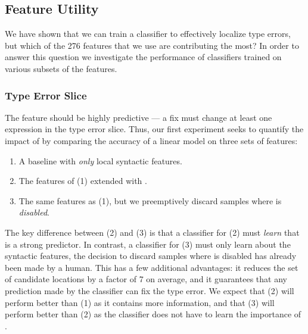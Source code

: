 \subsection{Feature Utility}
\label{sec:feature-utility}
We have shown that we can train a classifier to effectively localize
type errors, but which of the 276 features that we use are contributing
the most?
%
In order to answer this question we investigate the performance of
classifiers trained on various subsets of the features.

\subsubsection{Type Error Slice}
\label{sec:type-error-slice}
The \InSlice feature should be highly predictive --- a fix must change
at least one expression in the type error slice.
%
Thus, our first experiment seeks to quantify the impact of \InSlice by
comparing the accuracy of a linear model on three sets of features:
%
\begin{enumerate}
\item A baseline with \emph{only} local syntactic features.
\item The features of (1) extended with \InSlice.
\item The same features as (1), but we preemptively discard samples
  where \InSlice is \emph{disabled}.
\end{enumerate}
%
The key difference between (2) and (3) is that a classifier for (2) must
\emph{learn} that \InSlice is a strong predictor.
%
In contrast, a classifier for (3) must only learn about the syntactic
features, the decision to discard samples where \InSlice is disabled has
already been made by a human.
%
This has a few additional advantages: it reduces the set of candidate
locations by a factor of 7 on average, and it guarantees that any
prediction made by the classifier can fix the type error.
%
We expect that (2) will perform better than (1) as it contains more
information, and that (3) will perform better than (2) as the classifier
does not have to learn the importance of \InSlice.

